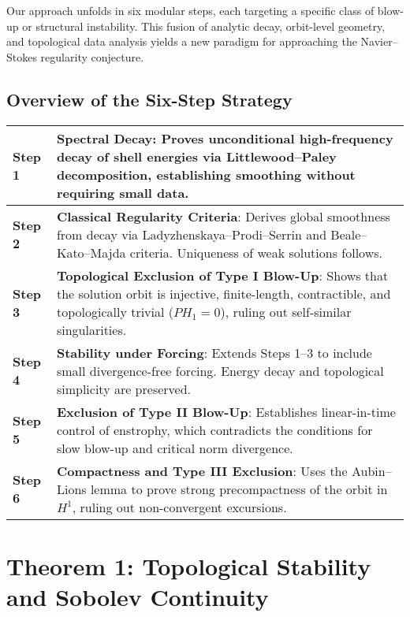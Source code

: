 \documentclass[11pt]{article}
\theoremstyle{definition}
\begin{document}
Our approach unfolds in six modular steps, each targeting a specific class of blow-up or structural instability. This fusion of analytic decay, orbit-level geometry, and topological data analysis yields a new paradigm for approaching the Navier--Stokes regularity conjecture.

\subsection*{Overview of the Six-Step Strategy}

\begin{center}
\renewcommand{\arraystretch}{1.3}
\begin{tabular}{|p{1.8cm}|p{12cm}|}
\hline
\textbf{Step 1} & \textbf{Spectral Decay}: Proves unconditional high-frequency decay of shell energies via Littlewood--Paley decomposition, establishing smoothing without requiring small data. \\
\hline
\textbf{Step 2} & \textbf{Classical Regularity Criteria}: Derives global smoothness from decay via Ladyzhenskaya--Prodi--Serrin and Beale--Kato--Majda criteria. Uniqueness of weak solutions follows. \\
\hline
\textbf{Step 3} & \textbf{Topological Exclusion of Type I Blow-Up}: Shows that the solution orbit is injective, finite-length, contractible, and topologically trivial (\(PH_1 = 0\)), ruling out self-similar singularities. \\
\hline
\textbf{Step 4} & \textbf{Stability under Forcing}: Extends Steps 1--3 to include small divergence-free forcing. Energy decay and topological simplicity are preserved. \\
\hline
\textbf{Step 5} & \textbf{Exclusion of Type II Blow-Up}: Establishes linear-in-time control of enstrophy, which contradicts the conditions for slow blow-up and critical norm divergence. \\
\hline
\textbf{Step 6} & \textbf{Compactness and Type III Exclusion}: Uses the Aubin--Lions lemma to prove strong precompactness of the orbit in \(H^1\), ruling out non-convergent excursions. \\
\hline
\end{tabular}
\end{center}


\section{Theorem 1: Topological Stability and Sobolev Continuity}
\end{document}
